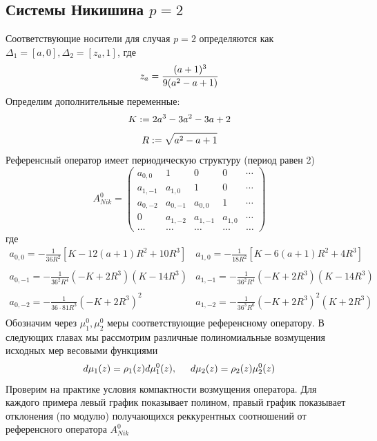 \documentclass[12pt, a4paper]{report}
\begin{document}
\newpage
\subsection {Системы Никишина $p=2$}
Соответствующие носители для случая $p=2$ определяются как $\Delta_1=[a,0], \Delta_2 =[z_a,1]$, где
$$
z_a=\frac{(a+1)^3}{9(a^2-a+1)} \\
$$
Определим дополнительные переменные:
$$
K:=2a^3-3a^2-3a+2 \\ 
$$
$$
R:=\sqrt{a^2-a+1} \\
$$
Референсный оператор имеет периодическую структуру (период равен 2) 
$$
A_{Nik}^0=
\left(\begin{array}{cccccccccccc}
a_{0,0}  & 1 		& 0 	  & 0 		 &  \cdots \\
a_{1,-1} & a_{1,0}  & 1 	  & 0 		 &  \cdots \\
a_{0,-2} & a_{0,-1} & a_{0,0} & 1 		 &  \cdots \\
0 		 & a_{1,-2} & a_{1,-1} & a_{1,0} &  \cdots \\
\ldots & \ldots & \ldots & \ldots & \ldots
\end{array}\right)
$$
где 
$$
\begin{array}{llllllllllllllll}
a_{0,0} = -\displaystyle\frac {1}{36R^2} [K - 12(a+1)R^2+10R^3] & a_{1,0}=-\displaystyle\frac{1}{18R^2}[K-6(a+1)R^2+4R^3] \\ \\ 
a_{0,-1}= -\displaystyle\frac {1}{36^2R^4}(-K+2R^3)(K-14R^3) & a_{1,-1}=-\displaystyle\frac{1}{36^2R^4}(-K+2R^3)(K-14R^3) \\ \\
a_{0,-2}= -\displaystyle\frac {1}{36 \cdot 81 R^3}(-K+2R^3)^2 & a_{1,-2}=-\displaystyle\frac{1}{36^3R^6}(-K+2R^3)^2(K+2R^3) \\
\end{array}
$$
Обозначим через $\mu_1^0, \mu_2^0$ меры соответствующие референсному оператору.
В следующих главах мы рассмотрим различные полиномиальные возмущения исходных мер весовыми функциями
$$
d\mu_1(z)= \rho_1(z) d\mu_1^0 (z) , \hspace{0.5cm} d\mu_2(z) =  \rho_2(z) \mu^0_2(z)
$$
Проверим на практике условия компактности возмущения оператора. 
Для каждого примера левый график показывает полином, правый график показывает отклонения (по модулю) получающихся реккурентных соотношений от референсного оператора $A_{Nik}^0$  


\newpage
\end{document}
